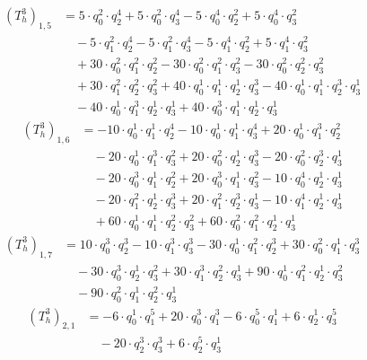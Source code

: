 \begin{align*}(T_{h}^3)_{1,5}&=5\cdot q_0^{2}\cdot q_2^{4}+5\cdot q_0^{2}\cdot q_3^{4}-5\cdot q_0^{4}\cdot q_2^{2}+5\cdot q_0^{4}\cdot q_3^{2}\\
&\quad -5\cdot q_1^{2}\cdot q_2^{4}-5\cdot q_1^{2}\cdot q_3^{4}-5\cdot q_1^{4}\cdot q_2^{2}+5\cdot q_1^{4}\cdot q_3^{2}\\
&\quad +30\cdot q_0^{2}\cdot q_1^{2}\cdot q_2^{2}-30\cdot q_0^{2}\cdot q_1^{2}\cdot q_3^{2}-30\cdot q_0^{2}\cdot q_2^{2}\cdot q_3^{2}\\
&\quad +30\cdot q_1^{2}\cdot q_2^{2}\cdot q_3^{2}+40\cdot q_0^{1}\cdot q_1^{1}\cdot q_2^{1}\cdot q_3^{3}-40\cdot q_0^{1}\cdot q_1^{1}\cdot q_2^{3}\cdot q_3^{1}\\
&\quad -40\cdot q_0^{1}\cdot q_1^{3}\cdot q_2^{1}\cdot q_3^{1}+40\cdot q_0^{3}\cdot q_1^{1}\cdot q_2^{1}\cdot q_3^{1}\end{align*}
\begin{align*}(T_{h}^3)_{1,6}&=-10\cdot q_0^{1}\cdot q_1^{1}\cdot q_2^{4}-10\cdot q_0^{1}\cdot q_1^{1}\cdot q_3^{4}+20\cdot q_0^{1}\cdot q_1^{3}\cdot q_2^{2}\\
&\quad -20\cdot q_0^{1}\cdot q_1^{3}\cdot q_3^{2}+20\cdot q_0^{2}\cdot q_2^{1}\cdot q_3^{3}-20\cdot q_0^{2}\cdot q_2^{3}\cdot q_3^{1}\\
&\quad -20\cdot q_0^{3}\cdot q_1^{1}\cdot q_2^{2}+20\cdot q_0^{3}\cdot q_1^{1}\cdot q_3^{2}-10\cdot q_0^{4}\cdot q_2^{1}\cdot q_3^{1}\\
&\quad -20\cdot q_1^{2}\cdot q_2^{1}\cdot q_3^{3}+20\cdot q_1^{2}\cdot q_2^{3}\cdot q_3^{1}-10\cdot q_1^{4}\cdot q_2^{1}\cdot q_3^{1}\\
&\quad +60\cdot q_0^{1}\cdot q_1^{1}\cdot q_2^{2}\cdot q_3^{2}+60\cdot q_0^{2}\cdot q_1^{2}\cdot q_2^{1}\cdot q_3^{1}\end{align*}
\begin{align*}(T_{h}^3)_{1,7}&=10\cdot q_0^{3}\cdot q_2^{3}-10\cdot q_1^{3}\cdot q_3^{3}-30\cdot q_0^{1}\cdot q_1^{2}\cdot q_2^{3}+30\cdot q_0^{2}\cdot q_1^{1}\cdot q_3^{3}\\
&\quad -30\cdot q_0^{3}\cdot q_2^{1}\cdot q_3^{2}+30\cdot q_1^{3}\cdot q_2^{2}\cdot q_3^{1}+90\cdot q_0^{1}\cdot q_1^{2}\cdot q_2^{1}\cdot q_3^{2}\\
&\quad -90\cdot q_0^{2}\cdot q_1^{1}\cdot q_2^{2}\cdot q_3^{1}\end{align*}
\begin{align*}(T_{h}^3)_{2,1}&=-6\cdot q_0^{1}\cdot q_1^{5}+20\cdot q_0^{3}\cdot q_1^{3}-6\cdot q_0^{5}\cdot q_1^{1}+6\cdot q_2^{1}\cdot q_3^{5}\\
&\quad -20\cdot q_2^{3}\cdot q_3^{3}+6\cdot q_2^{5}\cdot q_3^{1}\end{align*}
